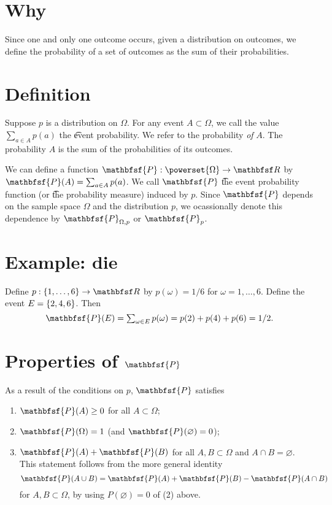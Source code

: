 

\section*{Why}

Since one and only one outcome occurs, given a distribution on outcomes, we define the probability of a set of outcomes as the sum of their probabilities.

\section*{Definition}

Suppose $p$ is a distribution on $\Omega $.
For any event $A \subset \Omega $, we call the value $\sum_{a \in A} p(a)$ the \t{event probability}.
We refer to the probability \textit{of} $A$.
The probability $A$ is the sum of the probabilities of its outcomes.

We can define a function $\mathbfsf{P} : \powerset{\Omega } \to \R $ by $\mathbfsf{P} (A) = \sum_{a \in A} p(a)$.
We call $\mathbfsf{P} $ \t{the event probability function} (or \t{the probability measure}) induced by $p$.
Since $\mathbfsf{P} $ depends on the sample space $\Omega $ and the distribution $p$, we ocassionally denote this dependence by $\mathbfsf{P} _{\Omega , p}$ or $\mathbfsf{P} _p$.

\section*{Example: die}

Define $p: \set{1, \dots , 6} \to \R $ by $p(\omega ) = 1/6$ for $\omega  = 1, \dots , 6$.
Define the event $E = \{2, 4, 6\}$.
Then
    \[
\textstyle
\mathbfsf{P} (E) = \sum_{\omega  \in E} p(\omega ) = p(2) + p(4) + p(6) = 1/2.
    \]

\section*{Properties of $\mathbfsf{P} $}

As a result of the conditions on $p$, $\mathbfsf{P} $ satisfies
    \begin{enumerate}
      \item $\mathbfsf{P} (A) \geq 0$ for all $A \subset \Omega $;
      \item $\mathbfsf{P} (\Omega ) = 1$ (and $\mathbfsf{P} (\varnothing) = 0$);
      \item $\mathbfsf{P} (A) + \mathbfsf{P} (B)$ for all $A, B \subset \Omega $ and $A \cap  B = \varnothing$.
This statement follows from the more general identity
          \[
\mathbfsf{P} (A \cup B) = \mathbfsf{P} (A) + \mathbfsf{P} (B) - \mathbfsf{P} (A \cap  B)
          \]
for $A, B \subset \Omega $, by using $P(\varnothing) = 0$ of (2) above.
    \end{enumerate}

